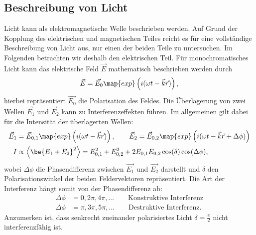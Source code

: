 \subsection{Beschreibung von Licht}
Licht kann als elektromagnetische Welle beschrieben werden.
Auf Grund der Kopplung des elektrischen und magnetischen Teiles reicht
es für eine vollständige Beschreibung von Licht aus, nur einen der beiden Teile zu untersuchen.
Im Folgenden betrachten wir deshalb den elektrischen Teil.
Für monochromatisches Licht kann das elektrische Feld $\vec{E}$ mathematisch beschrieben
werden durch
\begin{equation*}
  \vec{E} = \vec{E_0} \map{exp}\left(i (\omega t-\vec{k}\vec{r})\right),
\end{equation*}
hierbei repräsentiert $\vec{E_0}$ die Polarisation des Feldes.
Die Überlagerung von zwei Wellen $\vec{E}_1$ und $\vec{E}_2$ kann zu Interferenzeffekten führen.
Im allgemeinen gilt dabei für die Intensität der überlagerten Wellen:
\begin{align}
  \label{eq:Interferenz_enstehung}
  \begin{aligned}
  \vec{E}_1&=\vec{E}_{0,1} \map{exp}\left(i (\omega t-\vec{k}\vec{r})\right), \qquad \vec{E}_2 =\vec{E}_{0,2} \map{exp}\left(i (\omega t-\vec{k}\vec{r}+\Delta\phi)\right) \\
  I &\propto \left<\be{E_1+E_2}^2\right> = E_{0,1}^2 + E_{0,2}^2 + 2E_{0,1}E_{0,2}\cos(\delta)\cos(\Delta\phi),
\end{aligned}
\end{align}
wobei $\Delta\phi$ die Phasendifferenz zwischen $\vec{E_1}$ und $\vec{E_2}$ darstellt und
$\delta$ den Polarisationswinkel der beiden Feldervektoren repräsentiert.
Die Art der Interferenz hängt somit von der Phasendifferenz ab:
\begin{align}
  \Delta\phi &=0,2\pi,4\pi,\dots \qquad \text{Konstruktive Interferenz} \label{eq:Konstruktive}\\
  \Delta\phi &= \pi, 3\pi, 5\pi,\dots \qquad \text{Destruktive Interferenz}. \label{eq:Destruktive}
\end{align}
Anzumerken ist, dass senkrecht zueinander polarisiertes Licht $\delta=\frac{\pi}{2}$ nicht
interferenzfähig ist.
